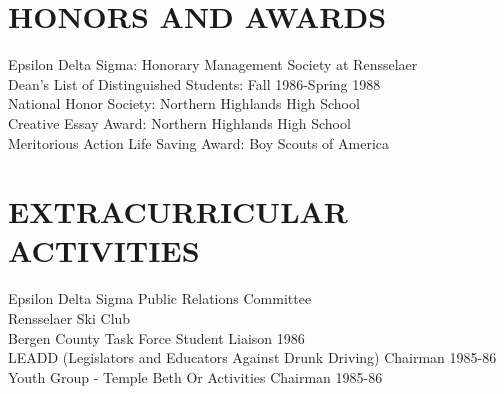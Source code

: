 \documentclass{res}
\begin{document}
\begin{resume}
 
\section{HONORS AND AWARDS}          
    Epsilon Delta Sigma: Honorary Management Society at          
    Rensselaer    \\      
    Dean's List of Distinguished Students: Fall 1986-Spring 1988  \\        
    National Honor Society: Northern Highlands High School  \\        
    Creative Essay Award: Northern Highlands High School  \\        
    Meritorious Action Life Saving Award: Boy Scouts of America          
 
\section{EXTRACURRICULAR ACTIVITIES}          
    Epsilon Delta Sigma Public Relations Committee \\         
    Rensselaer Ski Club     \\     
    Bergen County Task Force Student Liaison 1986  \\        
    LEADD (Legislators and Educators Against Drunk Driving) Chairman
     1985-86  \\        
    Youth Group - Temple Beth Or Activities Chairman 1985-86          
 
\end{resume}
\end{document}
